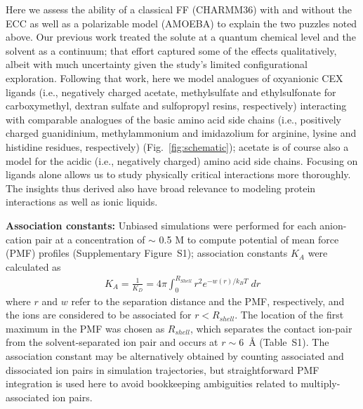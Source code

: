 \documentclass[journal=jpclcd,manuscript=article,articletitle=true,layout=twocolumn]{achemso}
\begin{document}
Here we assess the ability of a classical FF (CHARMM36\cite{Huang2013}) with and without the ECC as well as a polarizable model (AMOEBA\cite{Shi2013}) to explain the two puzzles noted above. Our previous work treated the solute at a quantum chemical level and the solvent as a continuum;\cite{Asthagiri2000} that effort captured some of the effects qualitatively, albeit with much uncertainty given the study's limited configurational exploration. Following that work, here we model analogues of oxyanionic CEX ligands (i.e., negatively charged acetate, methylsulfate and ethylsulfonate for carboxymethyl, dextran sulfate and sulfopropyl resins, respectively) interacting with comparable analogues of the basic amino acid side chains (i.e., positively charged guanidinium, methylammonium and imidazolium for arginine, lysine and histidine residues, respectively) (Fig.~\ref{fig:schematic}); acetate is of course also a model for the acidic (i.e., negatively charged) amino acid side chains. Focusing on ligands alone allows us to study physically critical interactions more thoroughly. The insights thus derived also have broad relevance to modeling protein interactions as well as ionic liquids.

\textbf{Association constants:} Unbiased simulations were performed for each anion-cation pair at a concentration of $\sim$ 0.5 M to compute potential of mean force (PMF) profiles (Supplementary Figure~S1); association constants $K_A$ were calculated as\cite{Zhu2012, Shi2017}
\begin{eqnarray}
K_{A} = \frac{1}{K_{D}} = 4 \pi \int_{0}^{R_{Shell}} r^2 e^{-w(r)/k_B T} \; dr
\label{eqn:Ka}
\end{eqnarray}
where $r$ and $w$ refer to the separation distance and the PMF, respectively, and the ions are considered to be associated for $r < R_{shell}$. The location of the first maximum in the PMF was chosen as $R_{shell}$,\cite{Shi2017} which separates the contact ion-pair from the solvent-separated ion pair and occurs at $r \sim 6$~{\AA} (Table~S1). The association constant may be alternatively obtained by counting associated and dissociated ion pairs in simulation trajectories,\cite{Debiec2014} but straightforward PMF integration is used here to avoid bookkeeping ambiguities related to multiply-associated ion pairs. 
\end{document}
